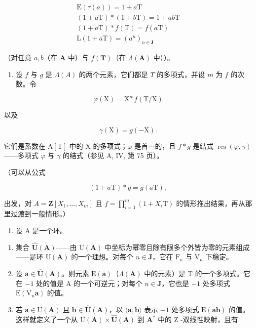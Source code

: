\[
\begin{array}{c} \mathrm{E} (\tau (a)) = 1 + a \mathrm{T} \\ (1 + a \mathrm{T}) * (1 + b \mathrm{T}) = 1 + a b \mathrm{T} \\ (1 + a \mathrm{T}) * f (\mathrm{T}) = f (a \mathrm{T}) \\ \mathrm{L} (1 + a \mathrm{T}) = (a ^ {n}) _ {n \in \mathbf {J}} \end{array}
\]

（对任意 \(a, b\)（在 \(\mathbf{A}\) 中）与 \(f(\mathbf{T})\)（在 \(\Lambda(\mathbf{A})\) 中））。

\begin{enumerate}
\def\labelenumi{\alph{enumi})}
\setcounter{enumi}{4}
\tightlist
\item
  设 \(f\) 与 \(g\) 是 \(\Lambda(A)\) 的两个元素，它们都是 \(T\) 的多项式，并设 \(m\) 为 \(f\) 的次数。令
\end{enumerate}

\[
\varphi (\mathrm{X}) = \mathrm{X} ^ {m} f (\mathrm{T} / \mathrm{X})
\]

以及

\[
\gamma (\mathrm{X}) = g (- \mathrm{X}).
\]

它们是系数在 A\([\mathrm{T}]\) 中的 X 的多项式；\(\varphi\) 是首一的，且 \(f*g\) 是结式 \(\operatorname{res}(\varphi, \gamma)\)——多项式 \(\varphi\) 与 \(\gamma\) 的结式（参见 A, IV, 第 75 页）。

（可以从公式

\[
(1 + a \mathrm{T}) * g = g (a \mathrm{T}),
\]

出发，对 \(A = \mathbf{Z}[X_{1}, \ldots, X_{m}]\) 且 \(f = \prod_{i=1}^{m} (1 + X_i \mathrm{T})\) 的情形推出结果，再从那里过渡到一般情形。）

\begin{enumerate}
\def\labelenumi{\arabic{enumi})}
\setcounter{enumi}{43}
\tightlist
\item
  设 A 是一个环。
\end{enumerate}

\begin{enumerate}
\def\labelenumi{\alph{enumi})}
\item
  集合 \(\hat{\mathbf{U}}(\mathbf{A})\)——由 \(\mathrm{U}(\mathbf{A})\) 中坐标为幂零且除有限多个外皆为零的元素组成——是环 \(\mathrm{U}(\mathbf{A})\) 的一个理想。对每个 \(n \in \mathbf{J}\)，它在 \(\mathrm{F}_n\) 与 \(\mathrm{V}_n\) 下稳定。
\item
  设 \(\boldsymbol{a} \in \hat{\mathbf{U}}(\mathbf{A})\)。则元素 \(\mathrm{E}(\boldsymbol{a})\)（\(\Lambda(\mathbf{A})\) 中的元素）是 T 的一个多项式。它在 \(-1\) 处的值是 A 的一个可逆元；对每个 \(n \in \mathbf{J}\)，它也是 \(-1\) 处多项式 \(\mathrm{E}(\mathrm{V}_n\boldsymbol{a})\) 的值。
\item
  若 \(\boldsymbol{a} \in \mathrm{U}(\mathbf{A})\) 且 \(\boldsymbol{b} \in \hat{\mathbf{U}}(\mathbf{A})\)，以 \(\langle \boldsymbol{a}, \boldsymbol{b} \rangle\) 表示 \(-1\) 处多项式 \(\mathrm{E}(\boldsymbol{a}\boldsymbol{b})\) 的值。这样就定义了一个从 \(\mathrm{U}(\mathbf{A}) \times \hat{\mathbf{U}}(\mathbf{A})\) 到 \(\mathbf{A}^*\) 中的 Z -双线性映射，且有
\end{enumerate}

